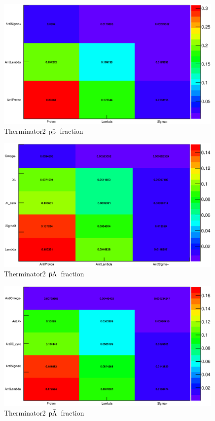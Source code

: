 \documentclass[ALICE,manyauthors]{ALICE_analysis_notes}
\newcommand{\pap}{$\rm p\bar{\rm p}$}
\newcommand{\pal}{$\rm p\bar{\rm \Lambda}$}
\newcommand{\apl}{$\bar{\rm p }\Lambda$}
\begin{document}
 \begin{figure}[h!]
   \centering
   \includegraphics[width=0.99\textwidth]{pics/papFractionTherm}
   \caption{Therminator2 \pap~fraction}
   \label{fig:papFractionTherm}
 \end{figure}

  \begin{figure}[h!]
   \centering
   \includegraphics[width=0.99\textwidth]{pics/aplFractionTherm}
   \caption{Therminator2 \apl~fraction}
   \label{fig:aplFractionTherm}
 \end{figure}

 \begin{figure}[h!]
   \centering
   \includegraphics[width=0.99\textwidth]{pics/palFractionTherm}
   \caption{Therminator2 \pal~fraction}
   \label{fig:palFractionTherm}
 \end{figure}
\end{document}
